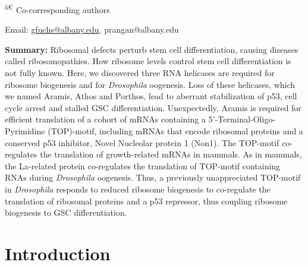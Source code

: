 \documentclass[12pt,twoside]{reedthesis}
\begin{document}
\textsuperscript{â€~}Co-corresponding authors

Email: \href{mailto:gfuchs@albany.edu}{{gfuchs@albany.edu}},
{prangan@albany.edu}

\textbf{Summary:} Ribosomal defects perturb stem cell differentiation,
causing diseases called ribosomopathies. How ribosome levels control
stem cell differentiation is not fully known. Here, we discovered three
RNA helicases are required for ribosome biogenesis and for \emph{Drosophila}
oogenesis. Loss of these helicases, which we named Aramis, Athos and
Porthos, lead to aberrant stabilization of p53, cell cycle arrest and
stalled GSC differentiation. Unexpectedly, Aramis is required for
efficient translation of a cohort of mRNAs containing a
5'-Terminal-Oligo-Pyrimidine (TOP)-motif, including mRNAs that encode
ribosomal proteins and a conserved p53 inhibitor, {No}vel
{N}ucleolar protein 1 (Non1). The TOP-motif co-regulates the
translation of growth-related mRNAs in mammals. As in mammals, the
La-related protein co-regulates the translation of TOP-motif containing
RNAs during \emph{Drosophila} oogenesis. Thus, a previously unappreciated
TOP-motif in \emph{Drosophila} responds to reduced ribosome biogenesis to
co-regulate the translation of ribosomal proteins and a p53 repressor,
thus coupling ribosome biogenesis to GSC differentiation.

\hypertarget{introduction-2}{%
\section{Introduction}\label{introduction-2}}
\end{document}
